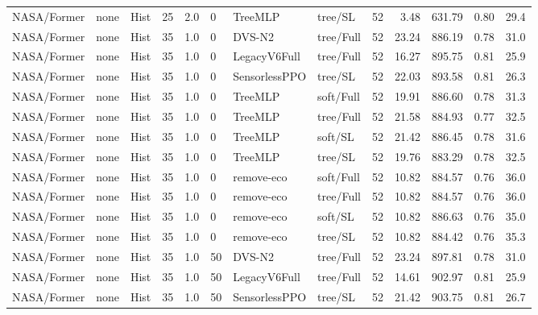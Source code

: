 \documentclass[10pt,a4paper]{article}
\begin{document}
\begin{landscape}
\begin{longtable}{llllllllrrrrr}
NASA/Former & none & Hist & 25 & 2.0 & 0 & TreeMLP & tree/SL & 52 & 3.48 & 631.79 & 0.80 & 29.4 \\

NASA/Former & none & Hist & 35 & 1.0 & 0 & DVS-N2 & tree/Full & 52 & 23.24 & 886.19 & 0.78 & 31.0 \\

NASA/Former & none & Hist & 35 & 1.0 & 0 & LegacyV6Full & tree/Full & 52 & 16.27 & 895.75 & 0.81 & 25.9 \\

NASA/Former & none & Hist & 35 & 1.0 & 0 & SensorlessPPO & tree/SL & 52 & 22.03 & 893.58 & 0.81 & 26.3 \\

NASA/Former & none & Hist & 35 & 1.0 & 0 & TreeMLP & soft/Full & 52 & 19.91 & 886.60 & 0.78 & 31.3 \\

NASA/Former & none & Hist & 35 & 1.0 & 0 & TreeMLP & tree/Full & 52 & 21.58 & 884.93 & 0.77 & 32.5 \\

NASA/Former & none & Hist & 35 & 1.0 & 0 & TreeMLP & soft/SL & 52 & 21.42 & 886.45 & 0.78 & 31.6 \\

NASA/Former & none & Hist & 35 & 1.0 & 0 & TreeMLP & tree/SL & 52 & 19.76 & 883.29 & 0.78 & 32.5 \\

NASA/Former & none & Hist & 35 & 1.0 & 0 & remove-eco & soft/Full & 52 & 10.82 & 884.57 & 0.76 & 36.0 \\

NASA/Former & none & Hist & 35 & 1.0 & 0 & remove-eco & tree/Full & 52 & 10.82 & 884.57 & 0.76 & 36.0 \\

NASA/Former & none & Hist & 35 & 1.0 & 0 & remove-eco & soft/SL & 52 & 10.82 & 886.63 & 0.76 & 35.0 \\

NASA/Former & none & Hist & 35 & 1.0 & 0 & remove-eco & tree/SL & 52 & 10.82 & 884.42 & 0.76 & 35.3 \\

NASA/Former & none & Hist & 35 & 1.0 & 50 & DVS-N2 & tree/Full & 52 & 23.24 & 897.81 & 0.78 & 31.0 \\

NASA/Former & none & Hist & 35 & 1.0 & 50 & LegacyV6Full & tree/Full & 52 & 14.61 & 902.97 & 0.81 & 25.9 \\

NASA/Former & none & Hist & 35 & 1.0 & 50 & SensorlessPPO & tree/SL & 52 & 21.42 & 903.75 & 0.81 & 26.7 \\


\end{longtable}
\end{landscape}
\end{document}
